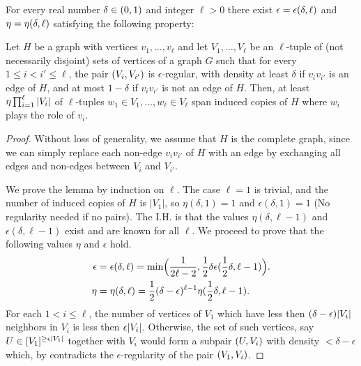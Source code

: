        \begin{lemma} \label{lem:H_like_partition_implies_H_abundance}
            For every real number $\delta \in ( 0, 1 )$ and integer $\ell > 0$ there exist $\epsilon = \epsilon ( \delta, \ell )$ and
            $\eta = \eta ( \delta, \ell )$ satisfying the following property:

            Let $H$ be a graph with vertices $v_1, \dots,v_\ell$ and let $V_1, \dots, V_\ell$ be an $\ell$-tuple of (not necessarily disjoint)
            sets of vertices of a graph $G$ such that for every $1 \leq i < i' \leq \ell$, the pair $( V_i, V_{i'} )$
            is $\epsilon$-regular, with density at least $\delta$ if $v_i v_{i'}$ is an edge of $H$, and at most $1 - \delta$
            if $v_i v_{i'}$ is not an edge of $H$.
            Then, at least $\eta \prod_{i=1}^\ell | V_i |$ of $\ell$-tuples $w_1 \in V_1, \dots, w_\ell \in V_\ell$
            span induced copies of $H$ where $w_i$ plays the role of $v_i$.
            \begin{proof}
                Without loss of generality, we assume that $H$ is the complete graph, since we can simply replace each non-edge
                $v_i v_{i'}$ of $H$ with an edge by exchanging all edges and non-edges between $V_i$ and $V_{i'}$.

                We prove the lemma by induction on $\ell$.
                The case $\ell=1$ is trivial, and the number of induced copies of $H$ is $|V_1|$, so $\eta(\delta, 1) = 1$ and
                $\epsilon(\delta, 1) = 1$ (No regularity needed if no pairs).
                The I.H. is that the values $\eta(\delta, \ell-1)$ and $\epsilon(\delta, \ell-1)$ exist and are known for all
                $\ell$.
                We proceed to prove that the following values $\eta$ and $\epsilon$ hold.
                \begin{align*}
                    \epsilon &= \epsilon(\delta, \ell)
                        = \min \Bigl( \frac{1}{2\ell - 2}, \frac{1}{2} \delta \epsilon(\frac{1}{2}\delta, \ell-1) \Bigr). \\
                    \eta &= \eta(\delta, \ell)
                        = \frac{1}{2} (\delta - \epsilon)^{\ell-1} \eta(\frac{1}{2}\delta, \ell-1).
                \end{align*}
                For each $1 < i \leq \ell$, the number of vertices of $V_1$ which have less then
                $(\delta - \epsilon) | V_i |$ neighbors in $V_i$ is less then $\epsilon | V_i |$.
                Otherwise, the set of such vertices, say $U \in [V_1]^{\geq \epsilon | V_1 |}$ together with $V_i$
                would form a subpair $( U, V_i )$ with density $< \delta - \epsilon$ which, by
                 contradicts the $\epsilon$-regularity of the pair $( V_1, V_i )$.


\end{proof}
\end{lemma}
